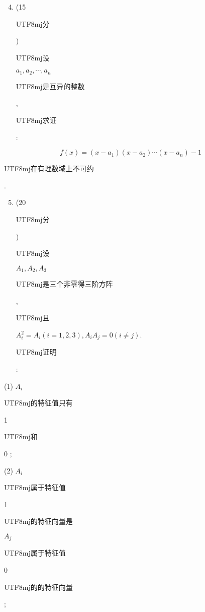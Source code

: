\documentclass[10pt]{article}
\begin{document}
\begin{enumerate}
  \setcounter{enumi}{3}
  \item (15 \begin{CJK}{UTF8}{mj}分\end{CJK}) \begin{CJK}{UTF8}{mj}设\end{CJK} $a_{1}, a_{2}, \cdots, a_{n}$ \begin{CJK}{UTF8}{mj}是互异的整数\end{CJK}, \begin{CJK}{UTF8}{mj}求证\end{CJK}:
\end{enumerate}
$$
f(x)=\left(x-a_{1}\right)\left(x-a_{2}\right) \cdots\left(x-a_{n}\right)-1
$$
\begin{CJK}{UTF8}{mj}在有理数域上不可约\end{CJK}.

\begin{enumerate}
  \setcounter{enumi}{4}
  \item (20 \begin{CJK}{UTF8}{mj}分\end{CJK}) \begin{CJK}{UTF8}{mj}设\end{CJK} $A_{1}, A_{2}, A_{3}$ \begin{CJK}{UTF8}{mj}是三个非零得三阶方阵\end{CJK}, \begin{CJK}{UTF8}{mj}且\end{CJK} $A_{i}^{2}=A_{i}(i=1,2,3), A_{i} A_{j}=0(i \neq j)$. \begin{CJK}{UTF8}{mj}证明\end{CJK}:
\end{enumerate}
(1) $A_{i}$ \begin{CJK}{UTF8}{mj}的特征值只有\end{CJK} 1 \begin{CJK}{UTF8}{mj}和\end{CJK} 0 ;

(2) $A_{i}$ \begin{CJK}{UTF8}{mj}属于特征值\end{CJK} 1 \begin{CJK}{UTF8}{mj}的特征向量是\end{CJK} $A_{j}$ \begin{CJK}{UTF8}{mj}属于特征值\end{CJK} 0 \begin{CJK}{UTF8}{mj}的的特征向量\end{CJK};
\end{document}
